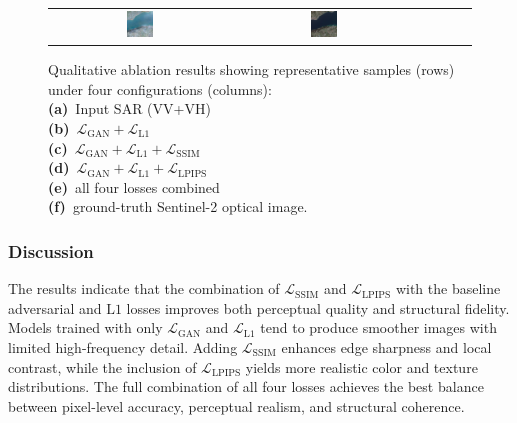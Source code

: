 \begin{figure}[t]
\begin{tabular}{*{6}{c}}
\includegraphics[width=0.155\textwidth]{img/ablation/sample_4/all.png} &
\includegraphics[width=0.155\textwidth]{img/ablation/sample_4/gt.png} \\
\end{tabular}

\caption{%
Qualitative ablation results showing representative samples (rows) under four configurations (columns):\\
\textbf{(a)}~Input SAR (VV+VH)\\
\textbf{(b)}~$\mathcal{L}_{\text{GAN}}{+}\mathcal{L}_{\text{L1}}$\\
\textbf{(c)}~$\mathcal{L}_{\text{GAN}}{+}\mathcal{L}_{\text{L1}}{+}\mathcal{L}_{\text{SSIM}}$\\
\textbf{(d)}~$\mathcal{L}_{\text{GAN}}{+}\mathcal{L}_{\text{L1}}{+}\mathcal{L}_{\text{LPIPS}}$\\
\textbf{(e)}~all four losses combined\\ 
\textbf{(f)}~ground-truth Sentinel-2 optical image.
}
\label{fig:ablation_samples}
\end{figure}

\subsubsection*{Discussion}
The results indicate that the combination of $\mathcal{L}_{\text{SSIM}}$ and $\mathcal{L}_{\text{LPIPS}}$ with the baseline adversarial and $\mathrm{L1}$ losses improves both perceptual quality and structural fidelity. 
Models trained with only $\mathcal{L}_{\text{GAN}}$ and $\mathcal{L}_{\text{L1}}$ tend to produce smoother images with limited high-frequency detail. 
Adding $\mathcal{L}_{\text{SSIM}}$ enhances edge sharpness and local contrast, while the inclusion of $\mathcal{L}_{\text{LPIPS}}$ yields more realistic color and texture distributions. 
The full combination of all four losses achieves the best balance between pixel-level accuracy, perceptual realism, and structural coherence.
